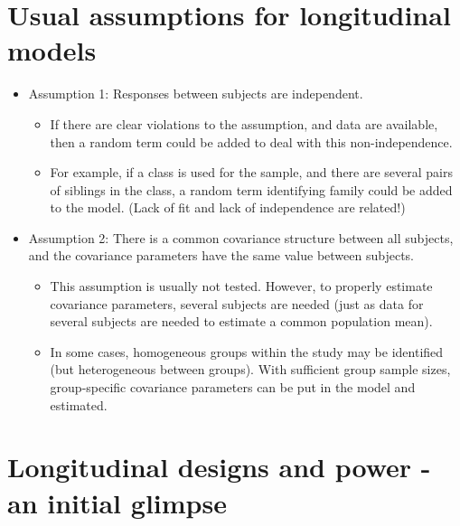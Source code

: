 \documentclass[
  9pt,
  ignorenonframetext,
]{beamer}
\begin{document}
\hypertarget{usual-assumptions-for-longitudinal-models}{%
\section{Usual assumptions for longitudinal
models}\label{usual-assumptions-for-longitudinal-models}}

\begin{frame}{}
\protect\hypertarget{section-9}{}
\begin{itemize}
\item
  Assumption 1: Responses between subjects are independent.

  \begin{itemize}
  \item
    If there are clear violations to the assumption, and data are
    available, then a random term could be added to deal with this
    non-independence.
  \item
    For example, if a class is used for the sample, and there are
    several pairs of siblings in the class, a random term identifying
    family could be added to the model. (Lack of fit and lack of
    independence are related!)
  \end{itemize}
\item
  Assumption 2: There is a common covariance structure between all
  subjects, and the covariance parameters have the same value between
  subjects.

  \begin{itemize}
  \item
    This assumption is usually not tested. However, to properly estimate
    covariance parameters, several subjects are needed (just as data for
    several subjects are needed to estimate a common population mean).
  \item
    In some cases, homogeneous groups within the study may be identified
    (but heterogeneous between groups). With sufficient group sample
    sizes, group-specific covariance parameters can be put in the model
    and estimated.
  \end{itemize}
\end{itemize}
\end{frame}

\hypertarget{longitudinal-designs-and-power---an-initial-glimpse}{%
\section{Longitudinal designs and power - an initial
glimpse}\label{longitudinal-designs-and-power---an-initial-glimpse}}
\end{document}
